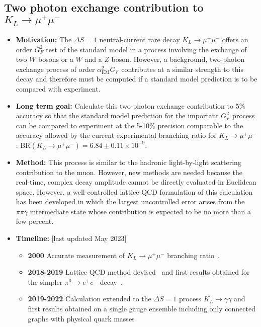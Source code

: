 \documentclass[12pt,hyperpdf]{article}
\begin{document}
\subsection{Two photon exchange contribution to $K_L\to\mu^+\mu^-$}
\begin{itemize}
    \item{\bf Motivation:} The $\Delta S=1$ neutral-current rare decay $K_L\to\mu^+\mu^-$ 
    offers an order $G_F^2$ test of the standard model in a process involving the 
    exchange of two $W$ bosons or a $W$ and a $Z$ boson.  However, a background, 
    two-photon exchange process of order $\alpha_{\mathrm{EM}}^2G_F$ contributes 
    at a similar strength to this decay and therefore must be computed if a standard 
    model prediction is to be compared with experiment.
    \item{\bf Long term goal:} Calculate this two-photon exchange contribution to 5\% 
    accuracy so that the standard model prediction for the important $G_F^2$ process 
    can be compared to experiment at the 5-10\% precision comparable to the accuracy 
    allowed by the current experimental branching ratio for $K_L\to\mu^+\mu^-$: 
    BR$(K_L\to\mu^+\mu^-) = 6.84\pm0.11\times 10^{-9}$.
    \item{\bf Method:}  This process is similar to the hadronic light-by-light scattering 
    contribution to the muon.  However, new methods are needed because the 
    real-time, complex decay amplitude cannot be directly evaluated in Euclidean 
    space.  However, a well-controlled lattice QCD formulation of this calculation 
    has been developed in which the largest uncontrolled error arises from the 
    $\pi\pi\gamma$ intermediate state whose contribution is expected to be no 
    more than a few percent.
\item{\bf Timeline:} \hfill [last updated May 2023]
\begin{itemize}
    \item{\bf 2000} Accurate measurement of $K_L\to\mu^+\mu^-$ branching 
    ratio~\cite{E871:2000wvm}.
    \item{\bf 2018-2019} Lattice QCD method devised~\cite{Christ:2020bzb} and 
    first results obtained for the simpler $\pi^0\to e^+ e^-$ 
    decay~\cite{Christ:2020dae, Christ:2022rho}.
    \item{\bf 2019-2022} Calculation extended to the $\Delta S=1$ process 
    $K_L\to\gamma\gamma$ and first results obtained on a single gauge 
    ensemble including only connected graphs with physical quark masses 

\end{itemize}
\end{itemize}
\end{document}
